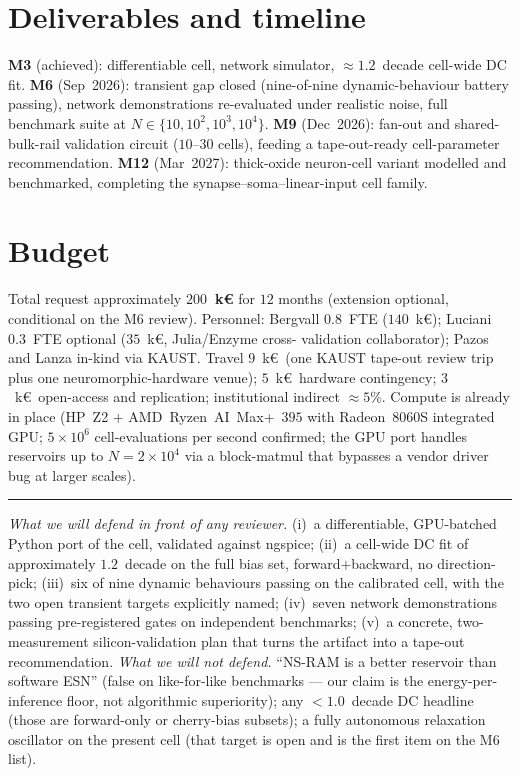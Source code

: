 \documentclass[fontsize=10pt]{article}
\begin{document}
\section{Deliverables and timeline}

\textbf{M3} (achieved): differentiable cell, network simulator,
$\approx 1.2$~decade cell-wide DC fit.
\textbf{M6} (Sep~2026): transient gap closed (nine-of-nine
dynamic-behaviour battery passing), network demonstrations
re-evaluated under realistic noise, full benchmark suite at
$N\!\in\!\{10,10^2,10^3,10^4\}$.
\textbf{M9} (Dec~2026): fan-out and shared-bulk-rail validation
circuit ($10$--$30$ cells), feeding a tape-out-ready cell-parameter
recommendation. \textbf{M12} (Mar~2027): thick-oxide neuron-cell
variant modelled and benchmarked, completing the
synapse--soma--linear-input cell family.

\section{Budget}
Total request approximately \textbf{$200$~k\euro} for $12$ months
(extension optional, conditional on the M6 review).
Personnel: Bergvall $0.8$~FTE ($140$~k\euro);
Luciani $0.3$~FTE optional ($35$~k\euro, Julia/Enzyme cross-
validation collaborator); Pazos and Lanza in-kind via KAUST.
Travel $9$~k\euro\ (one KAUST tape-out review trip plus one
neuromorphic-hardware venue); $5$~k\euro\ hardware contingency;
$3$~k\euro\ open-access and replication; institutional indirect
$\approx 5\%$. Compute is already in place
(HP~Z2 + AMD~Ryzen~AI~Max+~$395$ with Radeon~$8060$S integrated
GPU; $5\!\times\!10^6$ cell-evaluations per second confirmed; the
GPU port handles reservoirs up to $N\!=\!2\!\times\!10^4$ via a
block-matmul that bypasses a vendor driver bug at larger scales).

\vspace{2pt}
\hrule
\vspace{2pt}

{\footnotesize\emph{What we will defend in front of any reviewer.}
(i)~a differentiable, GPU-batched Python port of the cell, validated
against ngspice; (ii)~a cell-wide DC fit of approximately
$1.2$~decade on the full bias set, forward$+$backward, no
direction-pick; (iii)~six of nine dynamic behaviours passing on the
calibrated cell, with the two open transient targets explicitly
named; (iv)~seven network demonstrations passing pre-registered
gates on independent benchmarks; (v)~a concrete, two-measurement
silicon-validation plan that turns the artifact into a tape-out
recommendation.
\emph{What we will not defend.} ``NS-RAM is a better reservoir than
software ESN'' (false on like-for-like benchmarks --- our claim is
the energy-per-inference floor, not algorithmic superiority); any
$<1.0$~decade DC headline (those are forward-only or cherry-bias
subsets); a fully autonomous relaxation oscillator on the present
cell (that target is open and is the first item on the M6 list).}
\end{document}

